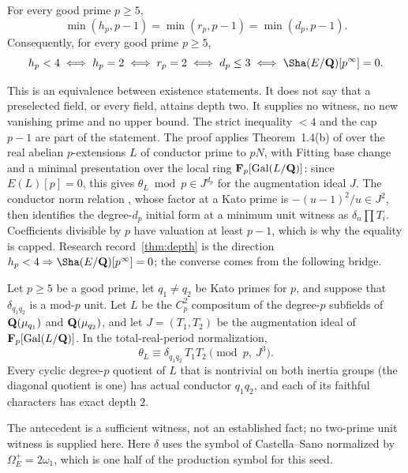 \begin{researchrecord}\label{thm:cmp}
For every good prime $p\ge5$,
\[
\min(h_p,p-1)=\min(r_p,p-1)=\min(d_p,p-1).
\]
Consequently, for every good prime $p\ge5$,
\[
h_p<4\iff h_p=2\iff r_p=2\iff d_p\le3\iff\Sha(E/\Q)[p^\infty]=0 .
\]
\end{researchrecord}
This is an equivalence between existence statements. It does not say that a preselected field, or every field, attains depth two. It supplies no witness, no new vanishing prime and no upper bound. The strict inequality $<4$ and the cap $p-1$ are part of the statement. The proof applies Theorem~1.4(b) of \cite{bh} over the real abelian $p$-extensions $L$ of conductor prime to $pN$, with Fitting base change and a minimal presentation over the local ring $\mathbf{F}_p[\operatorname{Gal}(L/\mathbf{Q})]$: since $E(L)[p]=0$, this gives $\theta_L\bmod p\in J^{d_p}$ for the augmentation ideal $J$. The conductor norm relation \cite[Prop.~2.4]{bh}, whose factor at a Kato prime is $-(u-1)^2/u\in J^2$, then identifies the degree-$d_p$ initial form at a minimum unit witness as $\delta_n\prod T_i$. Coefficients divisible by $p$ have valuation at least $p-1$, which is why the equality is capped. Research record~\ref{thm:depth} is the direction $h_p<4\Rightarrow\Sha(E/\Q)[p^\infty]=0$; the converse comes from the following bridge.

\begin{researchrecord}\label{thm:bridge}
Let $p\ge5$ be a good prime, let $q_1\ne q_2$ be Kato primes for $p$, and suppose that $\delta_{q_1q_2}$ is a mod-$p$ unit. Let $L$ be the $C_p^2$ compositum of the degree-$p$ subfields of $\mathbf{Q}(\mu_{q_1})$ and $\mathbf{Q}(\mu_{q_2})$, and let $J=(T_1,T_2)$ be the augmentation ideal of $\mathbf{F}_p[\operatorname{Gal}(L/\mathbf{Q})]$. In the total-real-period normalization,
\[
\theta_L\equiv\delta_{q_1q_2}\,T_1T_2\pmod{p,\ J^3}.
\]
Every cyclic degree-$p$ quotient of $L$ that is nontrivial on both inertia groups (the diagonal quotient is one) has actual conductor $q_1q_2$, and each of its faithful characters has exact depth $2$.
\end{researchrecord}
The antecedent is a sufficient witness, not an established fact; no two-prime unit witness is supplied here. Here $\delta$ uses the symbol of Castella--Sano normalized by $\Omega_E^+=2\omega_1$, which is one half of the production symbol for this seed.
